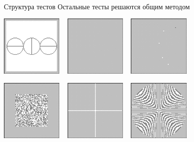 \begin{frame}[t]{Структура тестов}
        Остальные тесты решаются общим методом

        \begin{center}
        \includegraphics[height=3cm]{cham15.png}
        ~
        \includegraphics[height=3cm]{cham16.png}
        ~
        \includegraphics[height=3cm]{cham17.png}
        \par
        \includegraphics[height=3cm]{cham18.png}
        ~
        \includegraphics[height=3cm]{cham19.png}
        ~
        \includegraphics[height=3cm]{cham20.png}
        \end{center}
\end{frame}


